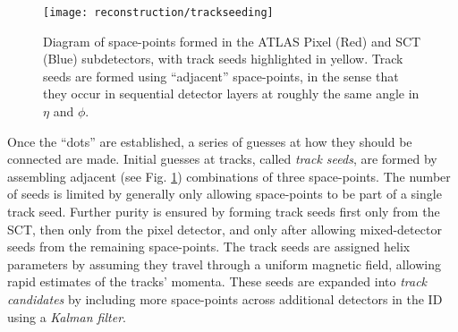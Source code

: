             \begin{figure}[tbh]
                \texttt{[image: reconstruction/trackseeding]}
                \caption{
                    Diagram of space-points formed in the ATLAS Pixel (Red) and SCT (Blue) subdetectors,
                        with track seeds highlighted in yellow\cite{track_seeding}.
                    Track seeds are formed using ``adjacent'' space-points, in the sense that they
                        occur in sequential detector layers at roughly the same angle in $\eta$ and $\phi$.
                }
                \label{fig:track_fit}
            \end{figure}

            Once the ``dots'' are established, a series of guesses at how they should be connected are made.
            Initial guesses at tracks, called \textit{track seeds},
                are formed by assembling adjacent (see Fig. \ref{fig:track_fit}) combinations of three space-points.
            The number of seeds is limited by generally only allowing space-points to be part of a single track seed.
            Further purity is ensured by forming track seeds first only from the SCT, then only from the pixel detector,
                and only after allowing mixed-detector seeds from the remaining space-points.
            The track seeds are assigned helix parameters by assuming they travel through a uniform magnetic field,
                allowing rapid estimates of the tracks' momenta.
            These seeds are expanded into \textit{track candidates}
                by including more space-points across additional detectors in the ID using a \textit{Kalman filter}\cite{kalman}.

